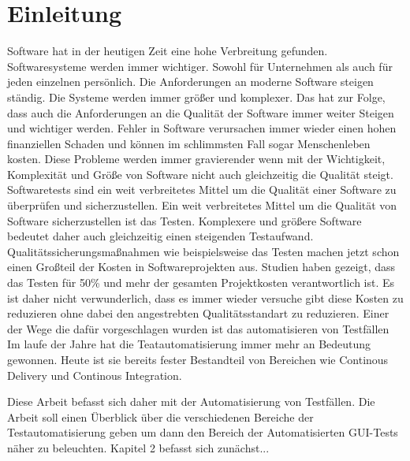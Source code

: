 \chapter{Einleitung}
\label{sec:einleitung}

Software hat in der heutigen Zeit eine hohe Verbreitung gefunden. Softwaresysteme werden immer wichtiger. Sowohl für Unternehmen als auch für jeden einzelnen persönlich. Die Anforderungen an moderne Software steigen ständig. Die Systeme werden immer größer und komplexer. Das hat zur Folge, dass auch die Anforderungen an die Qualität der Software immer weiter Steigen und wichtiger werden.
Fehler in Software verursachen immer wieder einen hohen finanziellen Schaden und können im schlimmsten Fall sogar Menschenleben kosten. Diese Probleme werden immer gravierender wenn mit der Wichtigkeit, Komplexität und Größe von Software nicht auch gleichzeitig die Qualität steigt. \cite{burnstein_practical_2003} \newline
Softwaretests sind ein weit verbreitetes Mittel um die Qualität einer Software zu überprüfen und sicherzustellen. Ein weit verbreitetes Mittel um die Qualität von Software sicherzustellen ist das Testen.
Komplexere und größere Software bedeutet daher auch gleichzeitig einen steigenden Testaufwand.\newline
Qualitätssicherungsmaßnahmen wie beispielsweise das Testen machen jetzt schon einen Großteil der Kosten in Softwareprojekten aus. Studien haben gezeigt, dass das Testen für 50\% und mehr der gesamten Projektkosten verantwortlich ist. \cite{ramler_economic_2006} 
Es ist daher nicht verwunderlich, dass es immer wieder versuche gibt diese Kosten zu reduzieren ohne dabei den angestrebten Qualitätsstandart zu reduzieren.
Einer der Wege die dafür vorgeschlagen wurden ist das automatisieren von Testfällen 
\cite{harrold_testing:_2000}
Im laufe der Jahre hat die Teatautomatisierung immer mehr an Bedeutung gewonnen. Heute ist sie bereits fester Bestandteil von Bereichen wie Continous Delivery und Continous Integration.

Diese Arbeit befasst sich daher mit der Automatisierung von Testfällen. Die Arbeit soll einen Überblick über die verschiedenen Bereiche der Testautomatisierung geben um dann den Bereich der Automatisierten GUI-Tests näher zu beleuchten.
Kapitel 2 befasst sich zunächst...





